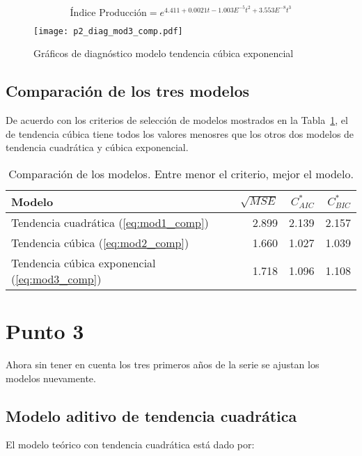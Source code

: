 \documentclass{tufte-handout}
\begin{document}
\begin{equation}
	\text{Índice Producción} = e^{4.411 + 0.0021 t - 1.003E^{-5} t^2 + 3.553E^{-8} t^3}
\end{equation}

\begin{figure*}[!ht]
    \texttt{[image: p2\_diag\_mod3\_comp.pdf]}
    \caption{Gráficos de diagnóstico modelo tendencia cúbica exponencial}
    \label{fig:p2_diag_mod3_comp.pdf}
\end{figure*}

\subsection*{Comparación de los tres modelos}

De acuerdo con los criterios de selección de modelos mostrados en la Tabla~\ref{tab:comparacion_modelos}, el de tendencia cúbica tiene todos los valores menosres que los otros dos modelos de tendencia cuadrática y cúbica exponencial.

\begin{table}[ht]
\centering
\begin{tabular}{lrrr}
  Modelo     & $\sqrt{MSE}$ & $C^{*}_{AIC}$ & $C^{*}_{BIC}$ \\ 
  \hline
Tendencia cuadrática (\ref{eq:mod1_comp}) & 2.899 & 2.139 & 2.157 \\ 
Tendencia cúbica (\ref{eq:mod2_comp}) & 1.660 & 1.027 & 1.039 \\ 
Tendencia cúbica exponencial (\ref{eq:mod3_comp}) & 1.718 & 1.096 & 1.108 \\ 
   \hline
\end{tabular}
\caption{Comparación de los modelos. Entre menor el criterio, mejor el modelo.} 
\label{tab:comparacion_modelos}
\end{table}



\section*{Punto 3}

Ahora sin tener en cuenta los tres primeros años de la serie se ajustan los modelos nuevamente.

\subsection*{Modelo aditivo de tendencia cuadrática}

El modelo teórico con tendencia cuadrática está dado por:
\end{document}
